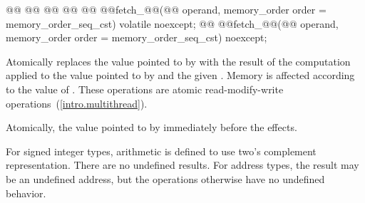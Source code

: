 %
%
%
%
%
%
%
%
%
%
%
%
%
%
%
\begin{itemdecl}
@@
@@
@@
@@
@@ @@fetch_@@(@@ operand, memory_order order = memory_order_seq_cst) volatile noexcept;
@@ @@fetch_@@(@@ operand, memory_order order = memory_order_seq_cst) noexcept;
\end{itemdecl}

\begin{itemdescr}
\pnum
\effects Atomically replaces the value pointed to  by
 with the result of the computation applied to the
value pointed to  by  and the given .
Memory is affected according to the value of .
These operations are atomic read-modify-write operations~(\ref{intro.multithread}).

\pnum
\returns Atomically, the value pointed to  by  immediately before the effects.

\pnum
{}%
\remarks For signed integer types, arithmetic is defined to use two's complement
representation. There are no undefined results. For address types, the result may be an
undefined address, but the operations otherwise have no undefined behavior.
\end{itemdescr}

